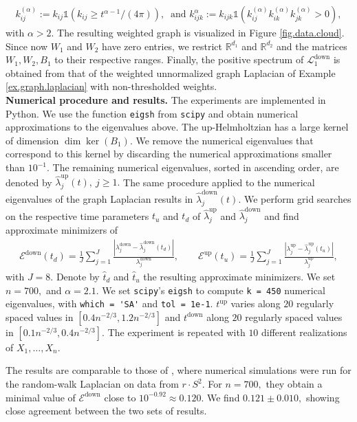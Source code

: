 \documentclass[10pt]{article}
\DeclareMathOperator{\up}{up}
\DeclareMathOperator{\down}{down}
\theoremstyle{plain}
\theoremstyle{definition}
\theoremstyle{remark}
\begin{document}
\begin{align}
    \label{eq.thresholded.weights}
    k_{ij}^{(\alpha)} := k_{ij}\mathds{1}(k_{ij} \geq t^{\alpha-1}/(4\pi)), \ \text{ and } k_{ijk}^{\alpha} := k_{ijk}\mathds{1}(k_{ij}^{(\alpha)} k_{ik}^{(\alpha)} k_{jk}^{(\alpha)} > 0),
\end{align}
with $\alpha > 2$. The resulting weighted graph is visualized in Figure \ref{fig.data.cloud}. Since now $W_1$ and $W_2$ have zero entries, we restrict $\mathbb{R}^{d_1}$ and $\mathbb{R}^{d_2}$ and the matrices $W_1,W_2,B_1$ to their respective ranges. Finally, the positive spectrum of $\mathscr{L}_1^{\down}$ is obtained from that of the weighted unnormalized graph Laplacian of Example \ref{ex.graph.laplacian} with non-thresholded weights. \\

\noindent\textbf{Numerical procedure and results.} The experiments are implemented in Python. We use the function \verb|eigsh| from \verb|scipy| and obtain numerical approximations to the eigenvalues above. The up-Helmholtzian has a large kernel of dimension $\dim\ker(B_1).$ We remove the numerical eigenvalues that correspond to this kernel by discarding the numerical approximations smaller than $10^{-1}.$ The remaining numerical eigenvalues, sorted in ascending order, are denoted by $\hat\lambda_j^{\up}(t), \ j\geq 1.$ The same procedure applied to the numerical eigenvalues of the graph Laplacian results in $\hat\lambda_j^{\down}(t).$ We perform grid searches on the respective time parameters $t_u$ and $t_d$ of $\hat\lambda_j^{\up}$ and $\hat\lambda_j^{\down}$ and find approximate minimizers of 
\begin{align*}
    \mathcal{E}^{\down}(t_{d}) = \frac{1}{J}\sum_{j=1}^J\frac{|\lambda_j^{\down} - \hat \lambda_j^{\down}(t_{d})|}{\lambda_j^{\down}},\qquad \mathcal{E}^{\up}(t_{u}) = \frac{1}{J}\sum_{j=1}^J\frac{|\lambda^{\up}_j - \hat \lambda_j^{\up}(t_{u})|}{\lambda^{\up}_j},
\end{align*}
with $J = 8.$ Denote by $\hat t_d$ and $\hat t_u$ the resulting approximate minimizers. We set $n=700,$ and $\alpha=2.1.$ We set \verb|scipy|'s \verb|eigsh| to compute \verb|k = 450| numerical eigenvalues, with \verb|which = 'SA'| and \verb|tol = 1e-1|. $t^{\up}$ varies along $20$ regularly spaced values in $[0.4n^{-2/3}, 1.2n^{-2/3}]$ and $t^{\down}$ along $20$ regularly spaced values in $[0.1n^{-2/3}, 0.4n^{-2/3}].$ The experiment is repeated with $10$ different realizations of $X_1, \dots, X_n.$

The results are comparable to those of \cite{MR4452681}, where numerical simulations were run for the random-walk Laplacian on data from $ r\cdot S^2$. For $n=700,$ they obtain a minimal value of $\mathcal{E}^{\down}$ close to $10^{-0.92} \approx  0.120.$ We find $0.121\pm 0.010,$ showing close agreement between the two sets of results.
\end{document}
